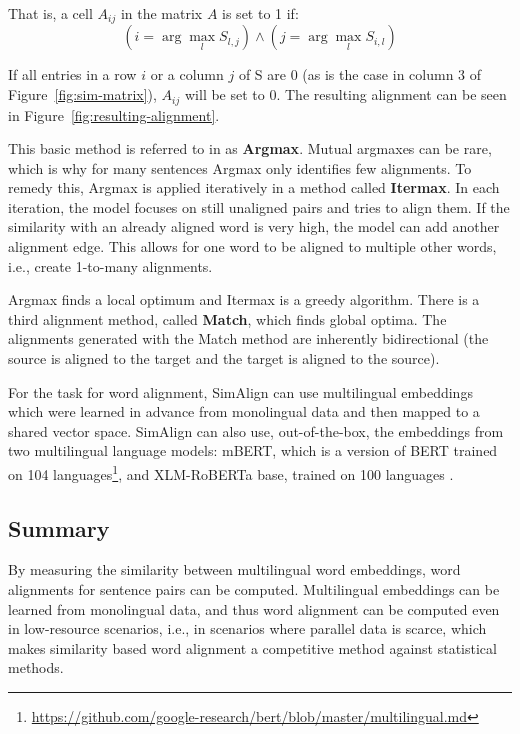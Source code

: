 That is, a cell $A_{ij}$ in the matrix $A$ is set to 1 if:
\[
	(i= \arg \max_l S_{l,j}) \land (j=\arg\max_l S_{i,l})
\]


If all entries in a row $i$ or a column $j$ of S are 0 (as is the case in column 3 of Figure~\ref{fig:sim-matrix}), $A_{ij}$ will be set to 0.
The resulting alignment can be seen in Figure~\ref{fig:resulting-alignment}.

This basic method is referred to in \cite{jalili-sabet-etal-2020-simalign} as \textbf{Argmax}. Mutual argmaxes can be rare, which is why for many sentences Argmax only identifies few alignments. 
To remedy this, Argmax is applied iteratively in a method called \textbf{Itermax}. 
In each iteration, the model focuses on still unaligned pairs and tries to align them. 
If the similarity with an already aligned word is very high, the model can add another alignment edge. 
This allows for one word to be aligned to multiple other words, i.e., create 1-to-many alignments.

Argmax finds a local optimum and Itermax is a greedy algorithm. 
There is a third alignment method, called \textbf{Match}, which finds global optima. 
The alignments generated with the Match method are inherently bidirectional (the source is aligned to the target and the target is aligned to the source).

For the task for word alignment, SimAlign can use multilingual embeddings which were learned in advance from monolingual data and then mapped to a shared vector space. 
SimAlign can also use, out-of-the-box, the embeddings from two multilingual language models: mBERT, which is a version of BERT \autocite{delvin-chang-2018-bert} trained on 104 languages\footnote{\url{https://github.com/google-research/bert/blob/master/multilingual.md}}, and XLM-RoBERTa base, trained on 100 languages \autocite{conneau-etal-2020-xlm}.

\subsection{Summary}
By measuring the similarity between multilingual word embeddings, word alignments for sentence pairs can be computed. 
Multilingual embeddings can be learned from monolingual data, and thus word alignment can be computed even in low-resource scenarios, i.e., in scenarios where parallel data is scarce, which makes similarity based word alignment a competitive method against statistical methods. 

